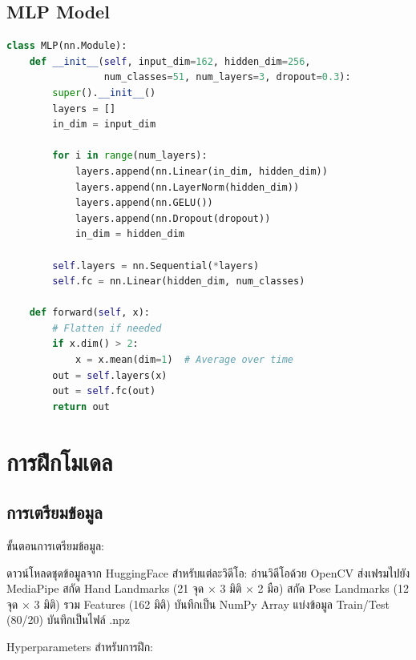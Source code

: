 \documentclass[12pt,a4paper]{report}
\begin{document}
\subsection{MLP Model}

\begin{lstlisting}[language=Python, caption=MLP Model Architecture]
class MLP(nn.Module):
    def __init__(self, input_dim=162, hidden_dim=256,
                 num_classes=51, num_layers=3, dropout=0.3):
        super().__init__()
        layers = []
        in_dim = input_dim
        
        for i in range(num_layers):
            layers.append(nn.Linear(in_dim, hidden_dim))
            layers.append(nn.LayerNorm(hidden_dim))
            layers.append(nn.GELU())
            layers.append(nn.Dropout(dropout))
            in_dim = hidden_dim
        
        self.layers = nn.Sequential(*layers)
        self.fc = nn.Linear(hidden_dim, num_classes)
    
    def forward(self, x):
        # Flatten if needed
        if x.dim() > 2:
            x = x.mean(dim=1)  # Average over time
        out = self.layers(x)
        out = self.fc(out)
        return out
\end{lstlisting}

\section{การฝึกโมเดล}

\subsection{การเตรียมข้อมูล}

ขั้นตอนการเตรียมข้อมูล:

\begin{algorithm}
\caption{Data Preparation Pipeline}
\label{alg:data_prep}
\begin{algorithmic}
\State ดาวน์โหลดชุดข้อมูลจาก HuggingFace
\State สำหรับแต่ละวิดีโอ:
    \State อ่านวิดีโอด้วย OpenCV
    \State ส่งเฟรมไปยัง MediaPipe
    \State สกัด Hand Landmarks (21 จุด × 3 มิติ × 2 มือ)
    \State สกัด Pose Landmarks (12 จุด × 3 มิติ)
    \State รวม Features (162 มิติ)
    \State บันทึกเป็น NumPy Array
\State แบ่งข้อมูล Train/Test (80/20)
\State บันทึกเป็นไฟล์ .npz
\end{algorithmic}
\end{algorithm}

Hyperparameters สำหรับการฝึก:
\end{document}
